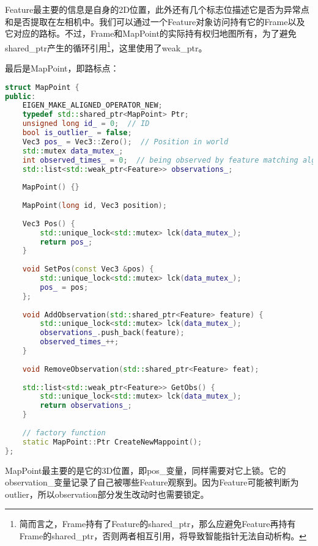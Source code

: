 Feature最主要的信息是自身的2D位置，此外还有几个标志位描述它是否为异常点和是否提取在左相机中。我们可以通过一个Feature对象访问持有它的Frame以及它对应的路标。不过，Frame和MapPoint的实际持有权归地图所有，为了避免shared\_ptr产生的循环引用\footnote{简而言之，Frame持有了Feature的shared\_ptr，那么应避免Feature再持有Frame的shared\_ptr，否则两者相互引用，将导致智能指针无法自动析构。}，这里使用了weak\_ptr。

最后是MapPoint，即路标点：
\begin{lstlisting}[language=c++,caption=slambook2/ch13/include/myslam/mappoint.h]
struct MapPoint {
public:
    EIGEN_MAKE_ALIGNED_OPERATOR_NEW;
    typedef std::shared_ptr<MapPoint> Ptr;
    unsigned long id_ = 0;  // ID
    bool is_outlier_ = false;
    Vec3 pos_ = Vec3::Zero();  // Position in world
    std::mutex data_mutex_;
    int observed_times_ = 0;  // being observed by feature matching algo.
    std::list<std::weak_ptr<Feature>> observations_;
    
    MapPoint() {}
    
    MapPoint(long id, Vec3 position);
    
    Vec3 Pos() {
        std::unique_lock<std::mutex> lck(data_mutex_);
        return pos_;
    }
    
    void SetPos(const Vec3 &pos) {
        std::unique_lock<std::mutex> lck(data_mutex_);
        pos_ = pos;
    };
    
    void AddObservation(std::shared_ptr<Feature> feature) {
        std::unique_lock<std::mutex> lck(data_mutex_);
        observations_.push_back(feature);
        observed_times_++;
    }
    
    void RemoveObservation(std::shared_ptr<Feature> feat);
    
    std::list<std::weak_ptr<Feature>> GetObs() {
        std::unique_lock<std::mutex> lck(data_mutex_);
        return observations_;
    }
    
    // factory function
    static MapPoint::Ptr CreateNewMappoint();
};
\end{lstlisting}

MapPoint最主要的是它的3D位置，即pos\_变量，同样需要对它上锁。它的observation\_变量记录了自己被哪些Feature观察到。因为Feature可能被判断为outlier，所以observation部分发生改动时也需要锁定。

